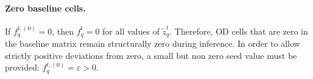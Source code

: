 \paragraph{Zero baseline cells.}
If $f_{q}^{t,(0)}=0$, then $f_q^t=0$ for all values of $\widetilde{z}_q^t$.
Therefore, OD cells that are zero in the baseline
matrix remain structurally zero during inference.
In order to allow strictly positive deviations from zero, a small but non zero seed value must be provided: $f_{q}^{t,(0)}=\varepsilon>0$.


